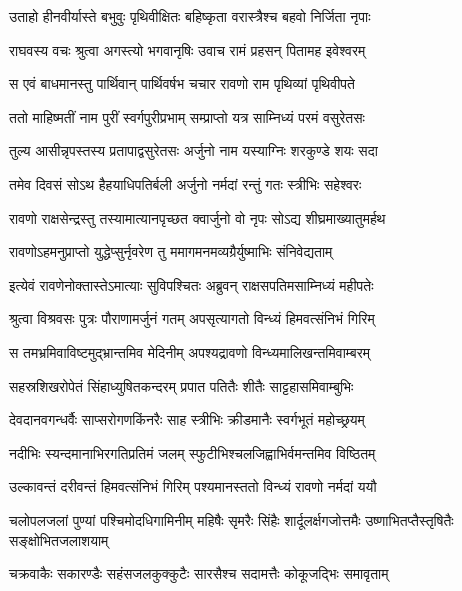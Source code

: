 \twolineshloka
{उताहो हीनवीर्यास्ते बभुवुः पृथिवीक्षितः}
{बहिष्कृता वरास्त्रैश्च बहवो निर्जिता नृपाः} %

\twolineshloka
{राघवस्य वचः श्रुत्वा अगस्त्यो भगवानृषिः}
{उवाच रामं प्रहसन् पितामह इवेश्वरम्} %

\twolineshloka
{स एवं बाधमानस्तु पार्थिवान् पार्थिवर्षभ}
{चचार रावणो राम पृथिव्यां पृथिवीपते} %

\twolineshloka
{ततो माहिष्मतीं नाम पुरीं स्वर्गपुरीप्रभाम्}
{सम्प्राप्तो यत्र साम्निध्यं परमं वसुरेतसः} %

\twolineshloka
{तुल्य आसीन्नृपस्तस्य प्रतापाद्वसुरेतसः}
{अर्जुनो नाम यस्याग्निः शरकुण्डे शयः सदा} %

\twolineshloka
{तमेव दिवसं सोऽथ हैहयाधिपतिर्बली}
{अर्जुनो नर्मदां रन्तुं गतः स्त्रीभिः सहेश्वरः} %

\twolineshloka
{रावणो राक्षसेन्द्रस्तु तस्यामात्यानपृच्छत}
{क्वार्जुनो वो नृपः सोऽद्य शीघ्रमाख्यातुमर्हथ} %

\twolineshloka
{रावणोऽहमनुप्राप्तो युद्धेप्सुर्नृवरेण तु}
{ममागमनमव्यग्रैर्युष्माभिः संनिवेद्यताम्} %

\twolineshloka
{इत्येवं रावणेनोक्तास्तेऽमात्याः सुविपश्चितः}
{अब्रुवन् राक्षसपतिमसाम्निध्यं महीपतेः} %

\twolineshloka
{श्रुत्वा विश्रवसः पुत्रः पौराणामर्जुनं गतम्}
{अपसृत्यागतो विन्ध्यं हिमवत्संनिभं गिरिम्} %

\twolineshloka
{स तमभ्रमिवाविष्टमुद्भ्रान्तमिव मेदिनीम्}
{अपश्यद्रावणो विन्ध्यमालिखन्तमिवाम्बरम्} %

\twolineshloka
{सहस्रशिखरोपेतं सिंहाध्युषितकन्दरम्}
{प्रपात पतितैः शीतैः साट्टहासमिवाम्बुभिः} %

\twolineshloka
{देवदानवगन्धर्वैः साप्सरोगणकिंनरैः}
{साह स्त्रीभिः क्रीडमानैः स्वर्गभूतं महोच्छ्रयम्} %

\twolineshloka
{नदीभिः स्यन्दमानाभिरगतिप्रतिमं जलम्}
{स्फुटीभिश्चलजिह्वाभिर्वमन्तमिव विष्ठितम्} %

\twolineshloka
{उल्कावन्तं दरीवन्तं हिमवत्संनिभं गिरिम्}
{पश्यमानस्ततो विन्ध्यं रावणो नर्मदां ययौ} %

\threelineshloka
{चलोपलजलां पुण्यां पश्चिमोदधिगामिनीम्}
{महिषैः सृमरैः सिंहैः शार्दूलर्क्षगजोत्तमैः}
{उष्णाभितप्तैस्तृषितैः सङ्क्षोभितजलाशयाम्} %

\twolineshloka
{चक्रवाकैः सकारण्डैः सहंसजलकुक्कुटैः}
{सारसैश्च सदामत्तैः कोकूजद्भिः समावृताम्} %

